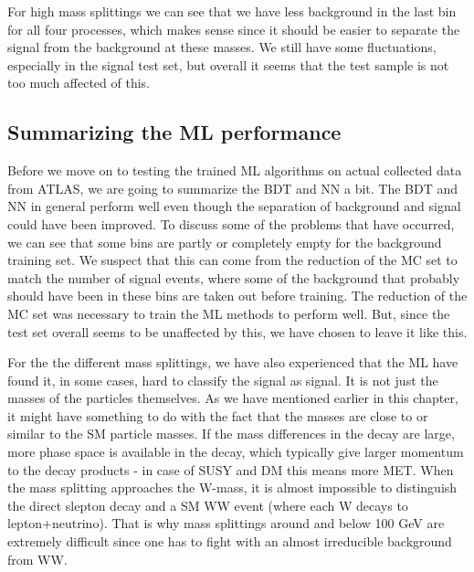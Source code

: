 For high mass splittings we can see that we have less background in the last bin for all four processes, which makes sense since it should be easier to separate the signal from the background at these masses. We still have some fluctuations, especially in the signal test set, but overall it seems that the test sample is not too much affected of this. 







\subsection{Summarizing the ML performance}
\label{sec:summary_ML}
Before we move on to testing the trained ML algorithms on actual collected data from ATLAS, we are going to summarize the BDT and NN a bit. The BDT and NN in general perform well even though the separation of background and signal could have been improved. To discuss some of the problems that have occurred, we can see that some bins are partly or completely empty for the background training set. We suspect that this can come from the reduction of the MC set to match the number of signal events, where some of the background that probably should have been in these bins are taken out before training. The reduction of the MC set was necessary to train the ML methods to perform well. But, since the test set overall seems to be unaffected by this, we have chosen to leave it like this.

For the the different mass splittings, we have also experienced that the ML have found it, in some cases, hard to classify the signal as signal. It is not just the masses of the particles themselves. As we have mentioned earlier in this chapter, it might have something to do with the fact that the masses are close to or similar to the SM particle masses. If the mass differences in the decay are large, more phase space is available in the decay, which typically give larger momentum to the decay products - in case of SUSY and DM this means more MET. When the mass splitting approaches the W-mass, it is almost impossible to distinguish the direct slepton decay and a SM WW event (where each W decays to lepton+neutrino). That is why mass splittings around and below 100 GeV are extremely difficult since one has to fight with an almost irreducible background from WW. 











